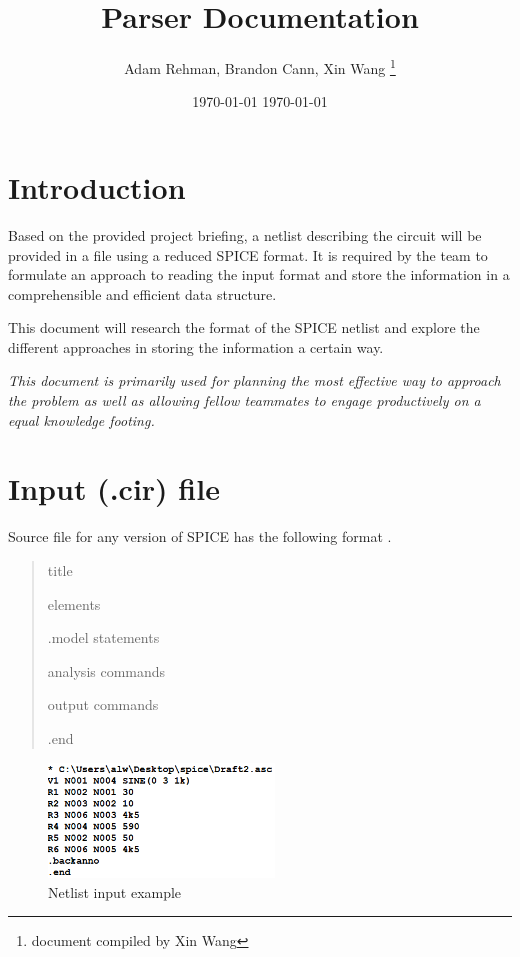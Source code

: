 \documentclass[a4paper, titlepage]{article}
\title{Parser Documentation}
\author{Adam Rehman, Brandon Cann, Xin Wang \thanks{document compiled by Xin Wang}}
\date \today
\date{ \today}
\begin{document}
    \maketitle
    
    \tableofcontents
    \pagebreak
 
    \section{Introduction}
    \indent
    Based on the provided project briefing, a netlist describing the circuit will be provided in a file 
    using a reduced SPICE format. It is required by the team to formulate an approach to reading the input format and 
    store the information in a comprehensible and efficient data structure. 
    \par
    This document will research the format of the SPICE netlist and explore the different approaches in 
    storing the information a certain way. 
    \par
    \begin{center}
        \textit{This document is primarily used for planning the most effective 
        way to approach the problem as well as allowing fellow teammates to 
        engage productively on a equal knowledge footing.}
    \end{center}
    \section{Input (.cir) file}
    Source file for any version of SPICE has the following format \cite{spice}.
    \begin{quotation}
        {\selectfont
            title \par
            elements \par
            .model statements \par
            analysis commands \par
            output commands \par
            .end \par
        }
    \end{quotation}

    \begin{figure}[h]
        \centering
        \includegraphics[width=60mm,scale=1]{spice netlist example}
        \caption{Netlist input example}
        \label{fig:Netlist input example}
    \end{figure}
\end{document}
